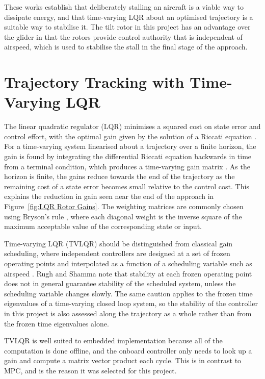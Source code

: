 These works establish that deliberately stalling an aircraft is a viable way to dissipate energy, and that time-varying LQR about an optimised trajectory is a suitable way to stabilise it. The tilt rotor in this project has an advantage over the glider in that the rotors provide control authority that is independent of airspeed, which is used to stabilise the stall in the final stage of the approach.

\section{Trajectory Tracking with Time-Varying LQR}
\label{sec:lit_tvlqr}

The linear quadratic regulator (LQR) minimises a squared cost on state error and control effort, with the optimal gain given by the solution of a Riccati equation \cite{anderson1990optimal}. For a time-varying system linearised about a trajectory over a finite horizon, the gain is found by integrating the differential Riccati equation backwards in time from a terminal condition, which produces a time-varying gain matrix  \cite{anderson1990optimal, tedrake2010lqrtrees}. As the horizon is finite, the gains reduce towards the end of the trajectory as the remaining cost of a state error becomes small relative to the control cost. This explains the reduction in gain seen near the end of the approach in Figure~\ref{fig:LQR Rotor Gains}. The weighting matrices are commonly chosen using Bryson's rule \cite{bryson1975applied}, where each diagonal weight is the inverse square of the maximum acceptable value of the corresponding state or input.

Time-varying LQR (TVLQR) should be distinguished from classical gain scheduling, where independent controllers are designed at a set of frozen operating points and interpolated as a function of a scheduling variable such as airspeed \cite{rugh2000research}. Rugh and Shamma \cite{rugh2000research} note that stability at each frozen operating point does not in general guarantee stability of the scheduled system, unless the scheduling variable changes slowly. The same caution applies to the frozen time eigenvalues of a time-varying closed loop system, so the stability of the controller in this project is also assessed along the trajectory as a whole rather than from the frozen time eigenvalues alone.

TVLQR is well suited to embedded implementation because all of the computation is done offline, and the onboard controller only needs to look up a gain and compute a matrix vector product each cycle. This is in contrast to MPC, and is the reason it was selected for this project.

